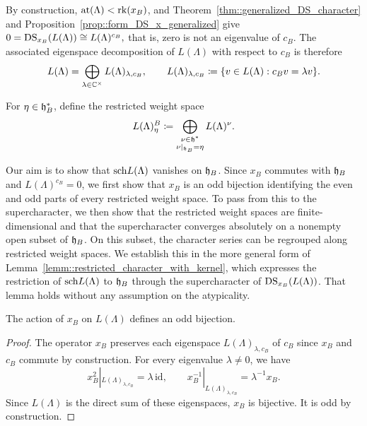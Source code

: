 By construction, ${\operatorname{at}}(\Lambda)<\operatorname{rk}(x_B)$, and Theorem~\ref{thm::generalized_DS_character} and Proposition~\ref{prop::form_DS_x_generalized} give 
$
0=\operatorname{DS}_{x_B}(L(\Lambda))
\cong L(\Lambda)^{c_B},
$ that is, zero is not an eigenvalue of $c_{B}$. The associated eigenspace decomposition of $L(\Lambda)$ with respect to $c_{B}$ is therefore
\begin{equation}
L(\Lambda)
=
\bigoplus_{\lambda\in{\mathbb C}^\times}L(\Lambda)_{\lambda,c_{B}},
\qquad
L(\Lambda)_{\lambda,c_{B}}
\coloneqq
\{v\in L(\Lambda):c_Bv=\lambda v\}.
\end{equation}

For $\eta\in{\mathfrak h}_B^\ast$, define the restricted weight space
\begin{equation}
L(\Lambda)_{\eta}^{B}
\coloneqq
\bigoplus_{\substack{\nu\in{\mathfrak h}^\ast\\
\nu|_{{\mathfrak h}_B}=\eta}}L(\Lambda)^\nu.
\end{equation}

Our aim is to show that ${\operatorname{sch}} L(\Lambda)$ vanishes on ${\mathfrak h}_B$. Since $x_B$
commutes with ${\mathfrak h}_B$ and $L(\Lambda)^{c_B}=0$, we first show that $x_B$ is
an odd bijection identifying the even and odd parts of every restricted
weight space. To pass from this to the supercharacter, we then show that the
restricted weight spaces are finite-dimensional and that the supercharacter
converges absolutely on a nonempty open subset of ${\mathfrak h}_B$. On this subset,
the character series can be regrouped along restricted weight spaces. We
establish this in the more general form of
Lemma~\ref{lemm::restricted_character_with_kernel}, which expresses the
restriction of ${\operatorname{sch}} L(\Lambda)$ to ${\mathfrak h}_B$ through the supercharacter of
$\operatorname{DS}_{x_B}(L(\Lambda))$. That lemma holds without any assumption on the
atypicality.

\begin{lemma}\label{lemm::x_B_bijection}
The action of $x_B$ on $L(\Lambda)$ defines an odd bijection.
\end{lemma}

\begin{proof}
The operator $x_B$ preserves each eigenspace $L(\Lambda)_{\lambda, c_B}$ of $c_{B}$ since $x_{B}$ and $c_{B}$ commute by construction. For every eigenvalue $\lambda\neq0$, we have
\[
x_B^2|_{L(\Lambda)_{\lambda, c_B}}
=
\lambda\,\mathrm{id},
\qquad
x_B^{-1}|_{L(\Lambda)_{\lambda, c_B}}
=
\lambda^{-1}x_B.
\]
Since $L(\Lambda)$ is the direct sum of these eigenspaces, $x_B$ is bijective. It is odd by construction.
\end{proof}

